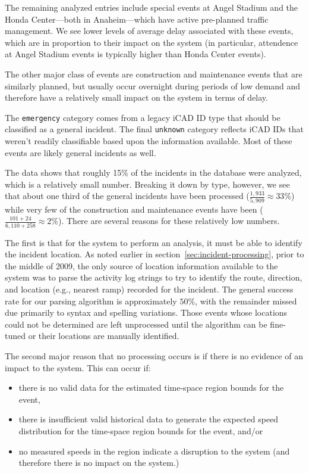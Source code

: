 \documentclass[12pt]{report}
\newcounter{time}
\newcounter{space}
\begin{document}
The remaining analyzed entries include special events at Angel Stadium and the
Honda Center---both in Anaheim---which have active pre-planned traffic
management.  We see lower levels of average delay associated with these events,
which are in proportion to their impact on the system (in particular, attendence
at Angel Stadium events is typically higher than Honda Center events).

The other major class of events are construction and maintenance events that are
similarly planned, but usually occur overnight during periods of low demand and
therefore have a relatively small impact on the system in terms of delay.

The \texttt{emergency} category comes from a legacy \ac{iCAD} ID type that
should be classified as a general incident.  The final \texttt{unknown} category
reflects \ac{iCAD} IDs that weren't readily classifiable based upon the
information available.  Most of these events are likely general incidents as
well.

The data shows that roughly 15\% of the incidents in the database were analyzed,
which is a relatively small number.  Breaking it down by type, however, we see
that about one third of the general incidents have been processed
($\frac{1,933}{5,909}\approx{}33\%$) while very few of the construction and maintenance
events have been ($\frac{101+24}{6,110+258} \approx 2\%$).  There are several
reasons for these relatively low numbers.  

The first is that for the system to perform an analysis, it must be able to
identify the incident location.  As noted earlier in
section~\ref{sec:incident-processing}, prior to the middle of 2009, the only
source of location information available to the system was to parse the activity
log strings to try to identify the route, direction, and location (e.g., nearest
ramp) recorded for the incident.  The general success rate for our parsing
algorithm is approximately $50\%$, with the remainder missed due primarily to
syntax and spelling variations.  Those events whose locations could not be
determined are left unprocessed until the algorithm can be fine-tuned or their
locations are manually identified.

The second major reason that no processing occurs is if there is no evidence of
an impact to the system.  This can occur if:
\begin{itemize}
\item there is no valid data for the estimated time-space region bounds for the event,
\item there is insufficient valid historical data to generate the expected speed
  distribution for the time-space region bounds for the event, and/or
\item no measured speeds in the region indicate a disruption to the system (and
  therefore there is no impact on the system.)
\end{itemize}
\end{document}
